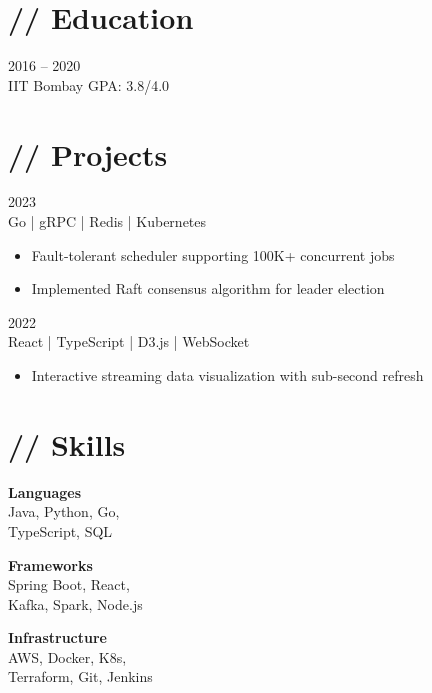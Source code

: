 \documentclass[10pt,a4paper]{article}
\begin{document}
\section{// Education}

 \hfill {\ttfamily\small\color{dimtext}2016 -- 2020}\\
{\color{neongreen}\ttfamily\small IIT Bombay} \hfill {\color{dimtext}GPA: 3.8/4.0}

\section{// Projects}

 \hfill {\ttfamily\small\color{dimtext}2023}\\
{\color{dimtext}\ttfamily\small Go | gRPC | Redis | Kubernetes}
\begin{itemize}[leftmargin=1.2em, itemsep=0pt, topsep=3pt, label={\color{neonblue}$\rightarrow$}]
\item \small\color{lighttext} Fault-tolerant scheduler supporting 100K+ concurrent jobs
\item \small\color{lighttext} Implemented Raft consensus algorithm for leader election
\end{itemize}
\vspace{6pt}

 \hfill {\ttfamily\small\color{dimtext}2022}\\
{\color{dimtext}\ttfamily\small React | TypeScript | D3.js | WebSocket}
\begin{itemize}[leftmargin=1.2em, itemsep=0pt, topsep=3pt, label={\color{neonblue}$\rightarrow$}]
\item \small\color{lighttext} Interactive streaming data visualization with sub-second refresh
\end{itemize}

\section{// Skills}

\noindent\begin{minipage}[t]{0.32\textwidth}
{\small\color{neonblue}\ttfamily\bfseries Languages}\\[3pt]
{\small\color{lighttext}Java, Python, Go,\\TypeScript, SQL}
\end{minipage}%
\begin{minipage}[t]{0.36\textwidth}
{\small\color{neonblue}\ttfamily\bfseries Frameworks}\\[3pt]
{\small\color{lighttext}Spring Boot, React,\\Kafka, Spark, Node.js}
\end{minipage}%
\begin{minipage}[t]{0.32\textwidth}
{\small\color{neonblue}\ttfamily\bfseries Infrastructure}\\[3pt]
{\small\color{lighttext}AWS, Docker, K8s,\\Terraform, Git, Jenkins}
\end{minipage}
\end{document}
